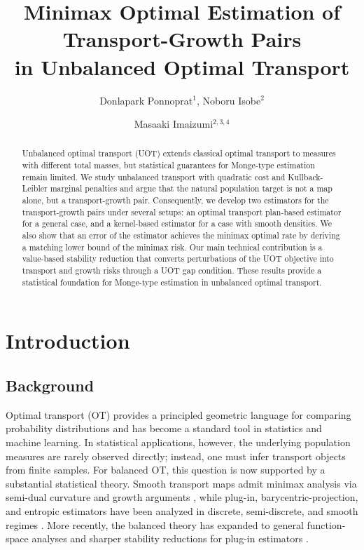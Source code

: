 \documentclass[11pt,reqno]{amsart}
\title{{\Large Minimax Optimal Estimation of Transport-Growth Pairs \\ in Unbalanced Optimal Transport}}
\author[M. Imaizumi and A. Coauthor]{Donlapark Ponnoprat$^{1}$, Noboru Isobe$^{2}$ \and 
Masaaki Imaizumi$^{2,3,4}$
}
\theoremstyle{definition}
\let\origmaketitle\maketitle
\def\maketitle{
  \begingroup
  \def\uppercasenonmath##1{} %
  \let\MakeUppercase\relax %
  \origmaketitle
  \endgroup
}
\begin{document}
\maketitle



\begin{abstract}
Unbalanced optimal transport (UOT) extends classical optimal transport to measures with different total masses, but statistical guarantees for Monge-type estimation remain limited. We study unbalanced transport with quadratic cost and Kullback-Leibler marginal penalties and argue that the natural population target is not a map alone, but a transport-growth pair. Consequently, we develop two estimators for the transport-growth pairs under several setups: an optimal transport plan-based estimator for a general case, and a kernel-based estimator for a case with smooth densities. We also show that an error of the estimator achieves the minimax optimal rate by deriving a matching lower bound of the minimax risk. Our main technical contribution is a value-based stability reduction that converts perturbations of the UOT objective into transport and growth risks through a UOT gap condition. These results provide a statistical foundation for Monge-type estimation in unbalanced optimal transport.
\end{abstract}


\section{Introduction}

\subsection{Background}

Optimal transport (OT) provides a principled geometric language for comparing probability distributions and has become a standard tool in statistics and machine learning. In statistical applications, however, the underlying population measures are rarely observed directly; instead, one must infer transport objects from finite samples. For balanced OT, this question is now supported by a substantial statistical theory. Smooth transport maps admit minimax analysis via semi-dual curvature and growth arguments \cite{hutter2021minimax}, while plug-in, barycentric-projection, and entropic estimators have been analyzed in discrete, semi-discrete, and smooth regimes \cite{deb2021barycentric,Pooladian2021,pooladian2023semidiscrete,manole2024plugin}. More recently, the balanced theory has expanded to general function-space analyses and sharper stability reductions for plug-in estimators \cite{divol2025general,balakrishnan2025stability}.
\end{document}

